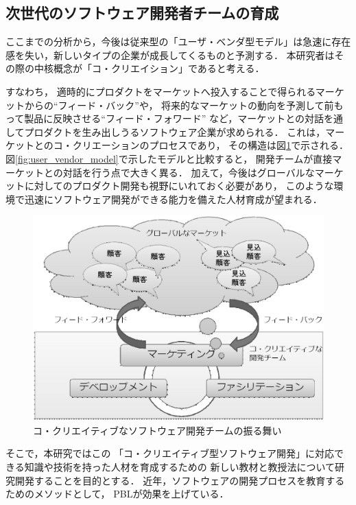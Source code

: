 \documentclass[a4j,9pt,twoside,twocolumn]{jsarticle}
\begin{document}
	\subsection{次世代のソフトウェア開発者チームの育成}

    ここまでの分析から，今後は従来型の「ユーザ・ベンダ型モデル」は急速に存在感を失い，新しいタイプの企業が成長してくるものと予測する．
    本研究者はその際の中核概念が「コ・クリエイション」であると考える．
    
    すなわち，
    適時的にプロダクトをマーケットへ投入することで得られるマーケットからの``フィード・バック''や，
    将来的なマーケットの動向を予測して前もって製品に反映させる``フィード・フォワード''
    など，マーケットとの対話を通してプロダクトを生み出しうるソフトウェア企業が求められる．
    これは，マーケットとのコ・クリエーションのプロセスであり，
    その構造は図\ref{fig:CcSD}で示される．
    図\ref{fig:user_vendor_model}で示したモデルと比較すると，
    開発チームが直接マーケットとの対話を行う点で大きく異る．
    加えて，今後はグローバルなマーケットに対してのプロダクト開発も視野にいれておく必要があり，
    このような環境で迅速にソフトウェア開発ができる能力を備えた人材育成が望まれる．
    
\begin{figure}
\begin{center}
\includegraphics[width=\linewidth]{figs/CcSD.eps}
\caption{コ・クリエイティブなソフトウェア開発チームの振る舞い}
\label{fig:CcSD}
\end{center}
\end{figure}
    
    そこで，本研究ではこの
    「コ・クリエイティブ型ソフトウェア開発」に対応できる知識や技術を持った人材を育成するための
    新しい教材と教授法について研究開発することを目的とする．
    近年，ソフトウェアの開発プロセスを教育するためのメソッドとして，
    PBLが効果を上げている\cite{pub:matsuzawa-2008}．
    
\end{document}
